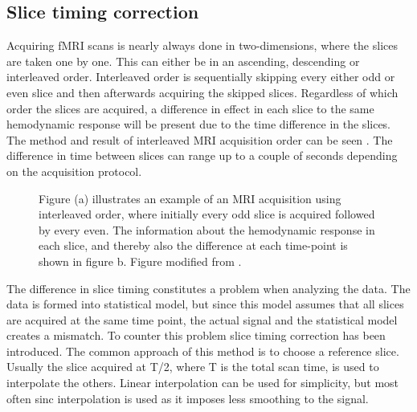 \subsection{Slice timing correction} 

Acquiring fMRI scans is nearly always done in two-dimensions, where the slices are taken one by one. This can either be in an ascending, descending or interleaved order. Interleaved order  is sequentially skipping every either odd or even slice and then afterwards acquiring the skipped slices. Regardless of which order the slices are acquired, a difference in effect in each slice to the same hemodynamic response will be present due to the time difference in the slices. The method and result of interleaved MRI acquisition order can be seen . The difference in time between slices can range up to a couple of seconds depending on the acquisition protocol. 
\begin{figure}[H] 
	\hspace{0.5cm}
	\hspace{0.5cm}
	\caption{Figure (a) illustrates an example of an MRI acquisition using interleaved order, where initially every odd slice is acquired followed by every even. The information about the hemodynamic response in each slice, and thereby also the difference at each time-point is shown in figure b. Figure modified from \cite{Poldrack2011}.}
	\label{fig:back:interleaved}
\end{figure}

The difference in slice timing constitutes a problem when analyzing the data. The data is formed into statistical model, but since this model assumes that all slices are acquired at the same time point, the actual signal and the statistical model creates a mismatch. To counter this problem slice timing correction has been introduced. The common approach of this method is to choose a reference slice. Usually the slice acquired at T/2, where T is the total scan time, is used to interpolate the others. Linear interpolation can be used for simplicity, but most often sinc interpolation is used as it imposes less smoothing to the signal. \cite{Poldrack2011} 

